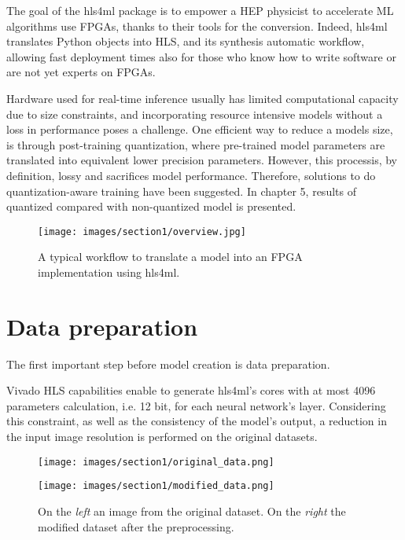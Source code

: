 \documentclass{article}
\begin{document}
\par The goal of the hls4ml package is to empower a HEP physicist to accelerate
ML algorithms use FPGAs, thanks to their tools for the conversion. 
Indeed, hls4ml translates Python objects into HLS, and its
synthesis automatic workflow, allowing fast deployment times also for
those who know how to write software or are not yet experts on FPGAs.

\par Hardware used for real-time inference usually has limited computational capacity due to size constraints, 
and incorporating resource intensive models without a loss in performance poses a challenge.
One efficient way to reduce a models size, is through post-training
quantization, where pre-trained model parameters are translated
into equivalent lower precision parameters.
However, this processis, by definition, lossy and sacrifices model performance. 
Therefore, solutions to do quantization-aware training have been suggested.
In chapter 5, results of quantized compared with non-quantized model is presented.

\begin{figure}[H]
  \centering
  \texttt{[image: images/section1/overview.jpg]}
  \caption{A typical workflow to translate a model into an FPGA implementation using hls4ml.}
  \label{fig:overview}
\end{figure}



\section{Data preparation}
The first important step before model creation is data preparation.
\par Vivado HLS capabilities enable to generate hls4ml's cores with 
at most 4096 parameters calculation, i.e. 12 bit, for each neural network's layer. 
Considering this constraint, as well as the consistency of the model's output,
a reduction in the input image resolution is performed on the original datasets. 

\begin{figure}[H]
  \centering
  \begin{minipage}[c]{.4\textwidth}
   {\texttt{[image: images/section1/original\_data.png]}}
    \end{minipage}
    \qquad \qquad
      \begin{minipage}[c]{0.4\textwidth}
  {\texttt{[image: images/section1/modified\_data.png]}}
     \end{minipage}
     \quad
     
   \caption{On the \textit{left} an image from the original dataset.
   On the \textit{right} the modified dataset after the preprocessing.}
    \label{fig:MNIST}
\end{figure}
\end{document}
